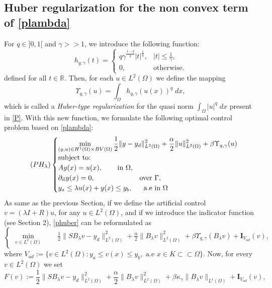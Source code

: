 \documentclass[11pt,a4paper]{amsart}
\newcommand{\om}{\Omega}
\newcommand{\norm}[1]{\lVert #1 \rVert}
\begin{document}
\subsection{Huber regularization for the non convex term of \eqref{plambda}}
For $q\in ]0, 1[$ and $\gamma>>1$, we introduce the following function:
\[
h_{q,\gamma}(t)=\begin{cases}
q\gamma^{\frac{1-q}{q}}|t|^{\frac{1}{q}}, & |t|\le \frac{1}{\gamma},\\ 0, & \mbox{otherwise.} 
\end{cases}
\]
defined for all $t\in \mathbb{R}$. Then, for each $u\in L^2(\om)$ we define the mapping
\[
\Upsilon_{q,\gamma}(u)=\int_{\om}h_{q,\gamma}(u(x))^q\; dx,
\]
which is called a \textit{Huber-type regularization} for the quasi norm $\int_{\om}|u|^q\; dx$ present in \eqref{P}.
 With this new function, we formulate the following optimal control problem based on \eqref{plambda}:
\begin{equation}\tag{$PH_{\lambda}$} \label{phuber}
    \begin{cases}
    \displaystyle\min_{(y,u)\in H^1(\om)\times BV(\om)} \frac{1}{2}\norm{y-y_d}^2_{L^2(\om)}+\frac{\alpha}{2}\norm{u}^2_{L^2(\om)}+\beta\Upsilon_{q,\gamma}(u)\\
    \mbox{subject to:}\\
    Ay(x)=u(x), \phantom{aaaa} \mbox{in } \om,\\
    \partial_{\Vec{n}}y(x)=0, \phantom{aaaaaaaaaaaa} \mbox{over } \Gamma,\\
   y_a\le\lambda u(x)+y(x)\le y_b, \phantom{aaa} \mbox{a.e in }\om 
    \end{cases}
\end{equation}
As same as the previous Section, if we define the artificial control $v=(\lambda I+R)u$, for any $u\in L^2(\om)$, and if we introduce the indicator function (see Section 2), \eqref{phuber} can be reformulated as 
\[
	\begin{cases}
		\displaystyle \min_{v\in L^{2}(\om)} \qquad  \frac{1}{2}\norm{S	B_{\lambda}v-y_d}_{L^2(\om)}^2+\frac{\alpha}{2}\norm{	B_{\lambda}v}_{L^2(\om)}^2+\beta\Upsilon_{q,\gamma}(	B_{\lambda}v)+\mathbf{I}_{V_{ad}}(v),
		\end{cases}
\]
where $ V_{ad}:=\{v\in L^2(\om): y_a\le v(x)\le y_b, \mbox{ a.e }x\in K\subset\subset\om \}$. Now, for every $v\in L^2(\om)$ we set 
\begin{equation}\label{convexI}
	F(v):=\frac{1}{2}\norm{S	B_{\lambda}v-y_d}_{L^2(\om)}^2+\frac{\alpha}{2}\norm{	B_{\lambda}v}_{L^2(\om)}^2+\beta\kappa_{\gamma}\norm{B_{\lambda}v}_{L^{1}(\om)}+\mathbf{I}_{V_{ad}}(v),
\end{equation}
\end{document}
